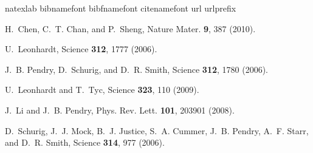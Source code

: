 \documentclass[a4paper, 12pt]{article}
\begin{document}
\begin{thebibliography}{22}

\expandafter\ifx\csname
natexlab\endcsname\relax\def\natexlab#1{#1}\fi
\expandafter\ifx\csname bibnamefont\endcsname\relax
  \def\bibnamefont#1{#1}\fi
\expandafter\ifx\csname bibfnamefont\endcsname\relax
  \def\bibfnamefont#1{#1}\fi
\expandafter\ifx\csname citenamefont\endcsname\relax
  \def\citenamefont#1{#1}\fi
\expandafter\ifx\csname url\endcsname\relax
  \def\url#1{\texttt{#1}}\fi
\expandafter\ifx\csname urlprefix\endcsname\relax\def\urlprefix{URL
}\fi \providecommand{\bibinfo}[2]{#2}
\providecommand{\eprint}[2][]{\url{#2}}

\bibinfo{author}{\bibfnamefont{H.}~\bibnamefont{Chen}},
  \bibinfo{author}{\bibfnamefont{C.~T.} \bibnamefont{Chan}}, \bibnamefont{and}
  \bibinfo{author}{\bibfnamefont{P.}~\bibnamefont{Sheng}},
  \bibinfo{journal}{Nature Mater.} \textbf{\bibinfo{volume}{9}},
  \bibinfo{pages}{387} (\bibinfo{year}{2010}).

\bibinfo{author}{\bibfnamefont{U.}~\bibnamefont{Leonhardt}},
  \bibinfo{journal}{Science} \textbf{\bibinfo{volume}{312}},
  \bibinfo{pages}{1777} (\bibinfo{year}{2006}).

\bibinfo{author}{\bibfnamefont{J.~B.} \bibnamefont{Pendry}},
  \bibinfo{author}{\bibfnamefont{D.}~\bibnamefont{Schurig}}, \bibnamefont{and}
  \bibinfo{author}{\bibfnamefont{D.~R.} \bibnamefont{Smith}},
  \bibinfo{journal}{Science} \textbf{\bibinfo{volume}{312}},
  \bibinfo{pages}{1780} (\bibinfo{year}{2006}).

\bibinfo{author}{\bibfnamefont{U.}~\bibnamefont{Leonhardt}} \bibnamefont{and}
  \bibinfo{author}{\bibfnamefont{T.}~\bibnamefont{Tyc}},
  \bibinfo{journal}{Science} \textbf{\bibinfo{volume}{323}},
  \bibinfo{pages}{110} (\bibinfo{year}{2009}).

\bibinfo{author}{\bibfnamefont{J.}~\bibnamefont{Li}} \bibnamefont{and}
  \bibinfo{author}{\bibfnamefont{J.~B.} \bibnamefont{Pendry}},
  \bibinfo{journal}{Phys. Rev. Lett.} \textbf{\bibinfo{volume}{101}},
  \bibinfo{pages}{203901} (\bibinfo{year}{2008}).

\bibinfo{author}{\bibfnamefont{D.}~\bibnamefont{Schurig}},
  \bibinfo{author}{\bibfnamefont{J.~J.} \bibnamefont{Mock}},
  \bibinfo{author}{\bibfnamefont{B.~J.} \bibnamefont{Justice}},
  \bibinfo{author}{\bibfnamefont{S.~A.} \bibnamefont{Cummer}},
  \bibinfo{author}{\bibfnamefont{J.~B.} \bibnamefont{Pendry}},
  \bibinfo{author}{\bibfnamefont{A.~F.} \bibnamefont{Starr}}, \bibnamefont{and}
  \bibinfo{author}{\bibfnamefont{D.~R.} \bibnamefont{Smith}},
  \bibinfo{journal}{Science} \textbf{\bibinfo{volume}{314}},
  \bibinfo{pages}{977} (\bibinfo{year}{2006}).


\end{thebibliography}
\end{document}
